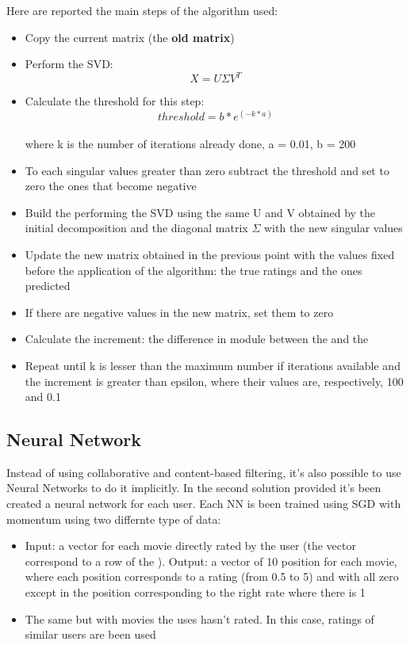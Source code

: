 \documentclass{article}
\begin{document}
Here are reported the main steps of the algorithm used:

\begin{itemize}
    \item Copy the current matrix (the \textbf{old matrix})
    \item Perform the SVD: \begin{equation}X = U\Sigma V^T\end{equation}
    \item Calculate the threshold for this step: \begin{equation}
        threshold = b * e^{(-k * a)}
    \end{equation}\\
    where k is the number of iterations already done, a = 0.01, b = 200
    \item To each singular values greater than zero subtract the threshold and set to zero the ones that become negative
    \item Build the  performing the SVD using the same U and V obtained by the initial decomposition and the diagonal matrix $\Sigma$ with the new singular values
    \item Update the new matrix obtained in the previous point with the values fixed before the application of the algorithm: the true ratings and the ones predicted
    \item If there are negative values in the new matrix, set them to zero
    \item Calculate the increment: the difference in module between the  and the 
    \item Repeat until k is lesser than the maximum number if iterations available and the increment is greater than epsilon, where their values are, respectively, 100 and 0.1
\end{itemize}

\subsection{Neural Network}
Instead of using collaborative and content-based filtering, it's also possible to use Neural Networks to do it implicitly. In the second solution provided it's been created a neural network for each user. Each NN is been trained using SGD with momentum using two differnte type of data:

\begin{itemize}
    \item Input: a vector for each movie directly rated by the user (the vector correspond to a row of the ).\newline
    Output: a vector of 10 position for each movie, where each position corresponds to a rating (from 0.5 to 5) and with all zero except in the position corresponding to the right rate where there is 1
    \item The same but with movies the uses hasn't rated. In this case, ratings of similar users are been used
\end{itemize}
\end{document}
